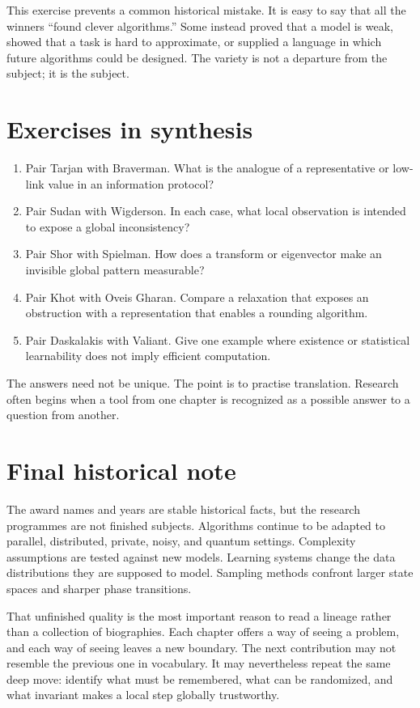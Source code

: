 This exercise prevents a common historical mistake. It is easy to say that all the winners ``found clever algorithms.'' Some instead proved that a model is weak, showed that a task is hard to approximate, or supplied a language in which future algorithms could be designed. The variety is not a departure from the subject; it is the subject.

\section{Exercises in synthesis}
\begin{enumerate}[label=\textbf{S\arabic*.}]
\item Pair Tarjan with Braverman. What is the analogue of a representative or low-link value in an information protocol?
\item Pair Sudan with Wigderson. In each case, what local observation is intended to expose a global inconsistency?
\item Pair Shor with Spielman. How does a transform or eigenvector make an invisible global pattern measurable?
\item Pair Khot with Oveis Gharan. Compare a relaxation that exposes an obstruction with a representation that enables a rounding algorithm.
\item Pair Daskalakis with Valiant. Give one example where existence or statistical learnability does not imply efficient computation.
\end{enumerate}

The answers need not be unique. The point is to practise translation. Research often begins when a tool from one chapter is recognized as a possible answer to a question from another.

\section{Final historical note}
The award names and years are stable historical facts, but the research programmes are not finished subjects. Algorithms continue to be adapted to parallel, distributed, private, noisy, and quantum settings. Complexity assumptions are tested against new models. Learning systems change the data distributions they are supposed to model. Sampling methods confront larger state spaces and sharper phase transitions.

That unfinished quality is the most important reason to read a lineage rather than a collection of biographies. Each chapter offers a way of seeing a problem, and each way of seeing leaves a new boundary. The next contribution may not resemble the previous one in vocabulary. It may nevertheless repeat the same deep move: identify what must be remembered, what can be randomized, and what invariant makes a local step globally trustworthy.
